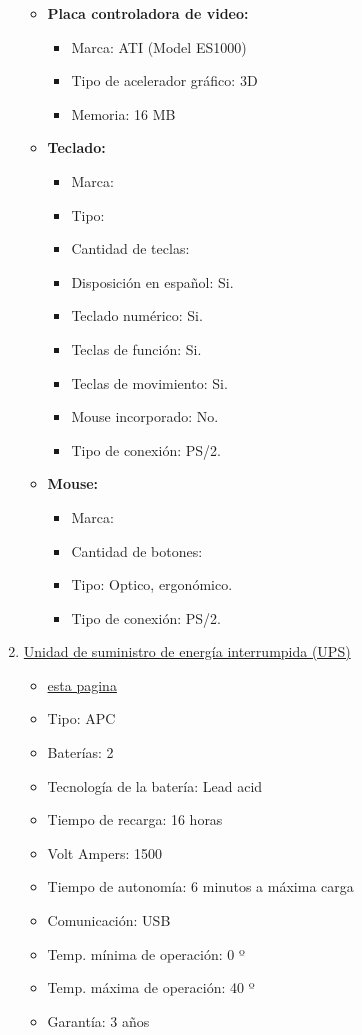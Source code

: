 \begin{enumerate}
\begin{itemize}
    \item \textbf{Placa controladora de video:}
    \begin{itemize}
      \item Marca: ATI (Model ES1000)
      \item Tipo de acelerador gráfico: 3D
      \item Memoria: 16 MB
    \end{itemize}
    
    \item \textbf{Teclado:}
    \begin{itemize}
      \item Marca: 
      \item Tipo:
      \item Cantidad de teclas:
      \item Disposición en español: Si.
      \item Teclado numérico: Si.
      \item Teclas de función: Si.
      \item Teclas de movimiento: Si.
      \item Mouse incorporado: No.
      \item Tipo de conexión: PS/2.
    \end{itemize}
    
    \item \textbf{Mouse:} 
    \begin{itemize}
      \item Marca:
      \item Cantidad de botones:
      \item Tipo: Optico, ergonómico.
      \item Tipo de conexión: PS/2.
    \end{itemize}
  \end{itemize}
  
  \item \underline{Unidad de suministro de energía interrumpida (UPS)}
  \begin{itemize}
    \item {} \href{http://accessories.us.dell.com/sna/productdetail.aspx?c=us&l=en&s=bsd&cs=04&sku=A0973336}{esta pagina}
    \item Tipo: APC
    \item Baterías: 2
    \item Tecnología de la batería: Lead acid
    \item Tiempo de recarga: 16 horas
    \item Volt Ampers: 1500
    \item Tiempo de autonomía: 6 minutos a máxima carga
    \item Comunicación: USB
    \item Temp. mínima de operación: 0 º
    \item Temp. máxima de operación: 40 º
    \item Garantía: 3 años 
  \end{itemize}
      
\end{enumerate}
